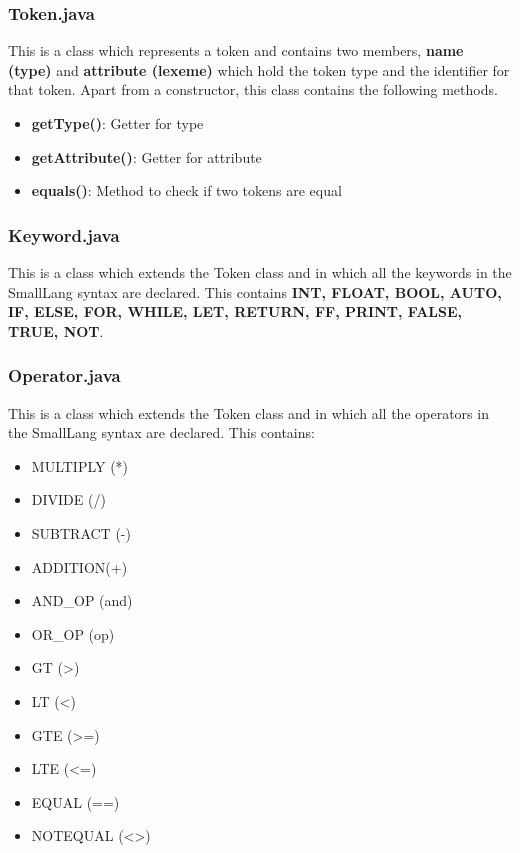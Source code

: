 \documentclass{article}
\begin{document}
					\subsubsection{Token.java}
					
					This is a class which represents a token and contains two members, \textbf{name (type)} and \textbf{attribute (lexeme)} which hold the token type and the identifier for that token. Apart from a constructor, this class contains the following methods.
					\begin{itemize}
						\item \textbf{getType()}: Getter for type
						\item \textbf{getAttribute()}: Getter for attribute
						\item \textbf{equals()}: Method to check if two tokens are equal
					\end{itemize}		
					
					\subsubsection{Keyword.java}
					
					This is a class which extends the Token class and in which all the keywords in the SmallLang syntax are declared. This contains \textbf{INT, FLOAT, BOOL, AUTO, IF, ELSE, FOR, WHILE, LET, RETURN, FF, PRINT, FALSE, TRUE, NOT}.	
				
					\subsubsection{Operator.java}
					
					This is a class which extends the Token class and in which all the operators in the SmallLang syntax are declared. This contains: 
					
					
					\begin{itemize}
						\item MULTIPLY (*)
						\item  DIVIDE (/)
						\item  SUBTRACT (-)
			    			\item ADDITION(+)
			    			\item AND\_OP (and)
			    			\item OR\_OP (op)
			    			\item GT (\textgreater)
						\item  LT (\textless)
			    			\item GTE (\textgreater=)
						\item  LTE (\textless=)
			    			\item  EQUAL (==)
						\item NOTEQUAL (\textless\textgreater)
					\end{itemize}
					
\end{document}
